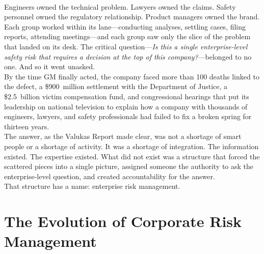 \documentclass[11pt,openany]{book}
\begin{document}
\begin{corporateexample}
\vspace{0.5em}\\[0.5em]       
Engineers owned the technical problem. Lawyers owned the claims. Safety personnel owned the regulatory relationship. Product managers owned the brand. Each group worked within its lane---conducting analyses, settling cases, filing reports, attending meetings---and each group saw only the slice of the problem that landed on its desk. The critical question---\emph{Is this a single enterprise-level safety risk that requires a decision at the top of this company?}---belonged to no one. And so it went unasked.
\vspace{0.5em}\\[0.5em]       
By the time GM finally acted, the company faced more than 100 deaths linked to the defect, a \$900~million settlement with the Department of Justice, a \$2.5~billion victim compensation fund, and congressional hearings that put its leadership on national television to explain how a company with thousands of engineers, lawyers, and safety professionals had failed to fix a broken spring for thirteen years.
\vspace{0.5em}\\[0.5em]         
The answer, as the Valukas Report made clear, was not a shortage of smart people or a shortage of activity. It was a shortage of integration. The information existed. The expertise existed. What did not exist was a structure that forced the scattered pieces into a single picture, assigned someone the authority to ask the enterprise-level question, and created accountability for the answer.
\vspace{0.5em}\\[0.5em]           
That structure has a name: enterprise risk management.


\end{corporateexample}


\section{The Evolution of Corporate Risk Management}
\label{sec:erm-evolution}
\end{document}
